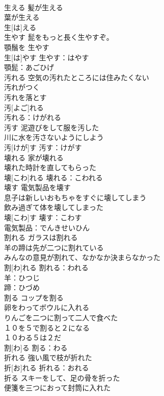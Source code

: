 \documentclass[8pt]{extreport}
\begin{document}
\begin{CJK}{UTF8}{min}
\\	生える	髪が生える 
\\	葉が生える 
\\	生[は]える						
\\	生やす	髭をもっと長く生やすぞ。 
\\	顎鬚を 生やす 
\\	生[は]やす			生やす：はやす
\\	顎髭：あごひげ
\\	汚れる	空気の汚れたところには住みたくない 
\\	汚れがつく 
\\	汚れを落とす 
\\	汚[よご]れる		
\\	汚れる：けがれる
\\	汚す	泥遊びをして服を汚した 
\\	川に水を汚さないようにしよう 
\\	汚[けが]す			汚す：けがす
\\	壊れる	家が壊れる 
\\	壊れた時計を直してもらった 
\\	壊[こわ]れる			壊れる：こわれる
\\	壊す	電気製品を壊す 
\\	息子は新しいおもちゃをすぐに壊してしまう 
\\	飲み過ぎて体を壊してしまった 
\\	壊[こわ]す			壊す：こわす 
\\	電気製品：でんきせいひん
\\	割れる	ガラスは割れる 
\\	羊の蹄は先が二つに割れている 
\\	みんなの意見が割れて、なかなか決まらなかった 
\\	割[わ]れる			割れる：われる
\\	羊：ひつじ
\\	蹄：ひづめ
\\	割る	コップを割る 
\\	卵をわってボウルに入れる 
\\	りんごを二つに割って二人で食べた 
\\	１０を５で割ると２になる 
\\	１０わる５は２だ 
\\	割[わ]る			割る：わる
\\	折れる	強い風で枝が折れた 
\\	折[お]れる			折れる：おれる
\\	折る	スキーをして、足の骨を折った 
\\	便箋を三つにおって封筒に入れた 

\end{CJK}
\end{document}
